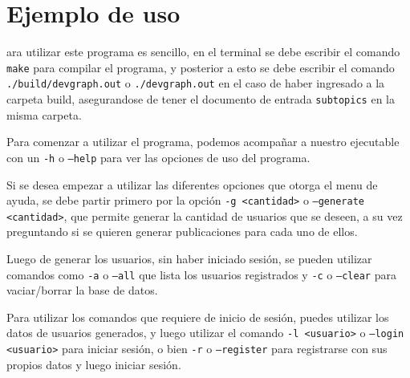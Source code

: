 \documentclass[9pt,letterpaper,onecolumn]{rho-class/rho}
\begin{document}
\newpage
\section{Ejemplo de uso}

ara utilizar este programa es sencillo, en el terminal se debe escribir el comando \texttt{make} para compilar el programa, y posterior a esto se debe escribir el comando \texttt{./build/devgraph.out} o \texttt{./devgraph.out} en el caso de haber ingresado a la carpeta build, asegurandose de tener el documento de entrada \texttt{subtopics} en la misma carpeta.

Para comenzar a utilizar el programa, podemos acompañar a nuestro ejecutable con un \texttt{-h} o \texttt{--help} para ver las opciones de uso del programa.

Si se desea empezar a utilizar las diferentes opciones que otorga el menu de ayuda, se debe partir primero por la opción \texttt{-g <cantidad>} o \texttt{--generate <cantidad>}, que permite generar la cantidad de usuarios que se deseen, a su vez preguntando si se quieren generar publicaciones para cada uno de ellos.

Luego de generar los usuarios, sin haber iniciado sesión, se pueden utilizar comandos como \texttt{-a} o \texttt{--all} que lista los usuarios registrados y \texttt{-c} o \texttt{--clear} para vaciar/borrar la base de datos.

Para utilizar los comandos que requiere de inicio de sesión, puedes utilizar los datos de usuarios generados, y luego utilizar el comando \texttt{-l <usuario>} o \texttt{--login <usuario>} para iniciar sesión, o bien \texttt{-r} o \texttt{--register} para registrarse con sus propios datos y luego iniciar sesión.
\end{document}
